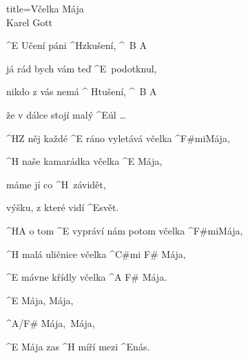 \begin{song}{title=\predtitle\centering Včelka Mája \\\large Karel Gott  \vspace*{-0.3cm}}  %
\begin{centerjustified}
\nejvetsi

\sloka
	^{E \z}Učení páni ^{\z H}zkušení, ^{\, B A}

	já rád bych vám teď ^{\z E \,}podotknul,

	nikdo z vás nemá ^{ \z H}tušení, ^{\, B A}

	že v dálce stojí malý ^{E}úl \dots

	^{H}Z něj každé ^{E \z}ráno vyletává včelka ^{F#mi}Mája,

	^{H \z}naše kamarádka včelka ^{E \z}Mája,

	máme jí co ^{\z H \,}závidět,
	
	výšku, z které vidí ^{E}svět.

	\phantom{\,}

	^{H}A o tom ^{E \z}vypráví nám potom včelka ^{F#mi}Mája,

	^{H \z}malá uličnice včelka ^{C#mi F# \z}Mája,~~~~~~~~

	^{E \z}mávne křídly včelka ^{A F# \z}Mája.~~~

	\phantom{\,}

	^{E \z}Mája, Mája,
	
	^{A/F#  \z}Mája,~Mája,

	^{E \z}Mája zas ^{H \z}míří mezi ^{E}nás.

\end{centerjustified}
\setcounter{Slokočet}{0}
\end{song}
